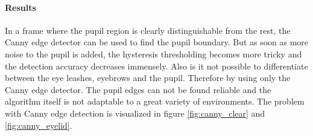 \paragraph{Results}
In a frame where the pupil region is clearly distinguishable from the rest, the Canny edge detector can be used to find the pupil boundary. But as soon as more noise to the pupil is added, the hysteresis thresholding becomes more tricky and the detection accuracy decreases immensely. Also is it not possible to differentiate between the eye leashes, eyebrows and the pupil. Therefore by using only the Canny edge detector. The pupil edges can not be found reliable and the algorithm itself is not adaptable to a great variety of environments. The problem with Canny edge detection is visualized in figure \ref{fig:canny_clear} and \ref{fig:canny_eyelid}.


